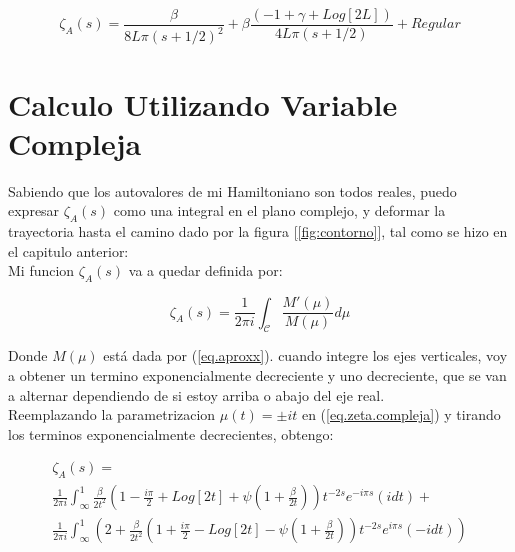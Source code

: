 \begin{equation}
    \zeta _A (s) =  \frac{\beta}{8 L \pi (s+1/2)^2} +
    \beta \frac{(-1 + \gamma + Log[2L ])}{4 L \pi (s+1/2)} + 
    Regular
\end{equation}

\section{Calculo Utilizando Variable Compleja}


Sabiendo que los autovalores de mi Hamiltoniano son todos reales, puedo expresar $\zeta _A (s)$ como una integral en el plano complejo, y deformar la trayectoria hasta el camino dado por la figura [\ref{fig:contorno}], tal como se hizo en el capitulo anterior: \\

Mi funcion $ \zeta _A (s) $ va a quedar definida por:

\begin{equation}
\zeta _A (s) = 
\frac{1}{2 \pi i} 
\int _{\mathcal{C}}
\frac{M ' ( \mu ) }{ M ( \mu ) } d \mu
\label{eq.zeta.compleja}
\end{equation}

Donde $M ( \mu )$ está dada por (\ref{eq.aproxx}).
cuando integre los ejes verticales, voy a obtener un termino exponencialmente decreciente y uno decreciente, que se van a alternar dependiendo de si estoy arriba o abajo del eje real. \\

Reemplazando la parametrizacion $ \mu  (t) = \pm i t$ en (\ref{eq.zeta.compleja}) y tirando los terminos exponencialmente decrecientes, obtengo:


\begin{equation}
\begin{array}{c}
    \zeta _A (s) = \\
     \frac{1}{2 \pi i} \int _{\infty} ^{1}
     \frac{\beta}{2 t^2} 
     \left(
     1 - \frac{i \pi}{2} + Log[2 t] + \psi (1 + \frac{\beta}{2 t})
     \right)
     t ^{-2s}
     e ^{- i \pi s} (i dt) + \\
     \frac{1}{2 \pi i} \int _{\infty} ^{1} 
     \left(
     2 + \frac{\beta}{2 t^2}
     \left(
     1 + \frac{i \pi}{2} - Log[2 t] - \psi (1+ \frac{\beta}{2 t})
     \right)
     t ^{-2s}
     e ^{ i \pi s} (-i dt)
     \right)     
\end{array}
\end{equation}

